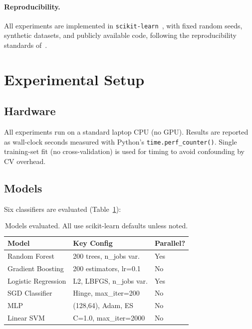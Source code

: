 \documentclass[10pt,twocolumn]{article}
\begin{document}
\paragraph{Reproducibility.}
All experiments are implemented in \texttt{scikit-learn}~\citep{pedregosa2011scikit}, 
with fixed random seeds, synthetic datasets, and publicly available code,
following the reproducibility standards of~\citet{pineau2021improving}.

\section{Experimental Setup}

\subsection{Hardware}
All experiments run on a standard laptop CPU (no GPU). 
Results are reported as wall-clock seconds measured with Python's 
\texttt{time.perf\_counter()}. 
Single training-set fit (no cross-validation) is used for timing 
to avoid confounding by CV overhead.

\subsection{Models}

Six classifiers are evaluated (Table~\ref{tab:models}):

\begin{table}[h]
\centering
\caption{Models evaluated. All use scikit-learn defaults unless noted.}
\label{tab:models}
\small
\begin{tabular}{lll}
\toprule
\textbf{Model} & \textbf{Key Config} & \textbf{Parallel?} \\
\midrule
Random Forest      & 200 trees, n\_jobs var.  & Yes \\
Gradient Boosting  & 200 estimators, lr=0.1   & No  \\
Logistic Regression & L2, LBFGS, n\_jobs var. & Yes \\
SGD Classifier     & Hinge, max\_iter=200     & No  \\
MLP                & (128,64), Adam, ES       & No  \\
Linear SVM         & C=1.0, max\_iter=2000    & No  \\
\bottomrule
\end{tabular}
\end{table}
\end{document}
